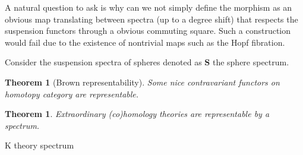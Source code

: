 \documentclass[12pt]{article}
\numberwithin{equation}{section}
\newcounter{dummy} \numberwithin{dummy}{section}
\newtheorem{theorem}[dummy]{Theorem}
\begin{document}
	A natural question to ask is why can we not simply define the morphism as an obvious map translating between spectra (up to a degree shift) that respects the suspension functors through a obvious commuting square. Such a construction would fail due to the existence of nontrivial maps such as the Hopf fibration.
	
	Consider the suspension spectra of spheres denoted as $\mathbf{S}$ the sphere spectrum.
	
	\begin{theorem}[Brown representability]
		Some nice contravariant functors on homotopy category are representable.
	\end{theorem}
	\begin{theorem}
		Extraordinary (co)homology theories are representable by a spectrum.
	\end{theorem}
	K theory spectrum
	\appendix
	
	
	
	
	
	
\end{document}
